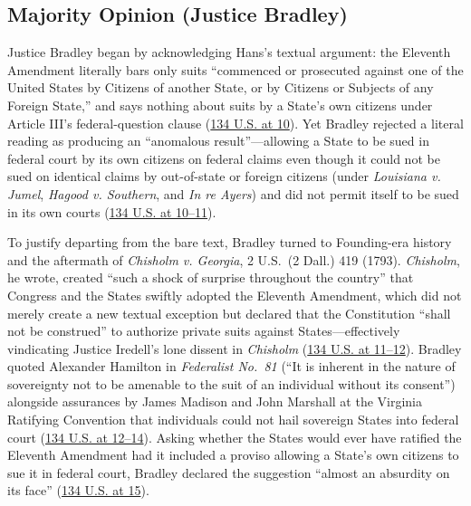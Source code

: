 \documentclass[12pt]{article}
\begin{document}
\subsection{Majority Opinion (Justice Bradley)}
Justice Bradley began by acknowledging Hans's textual argument: the Eleventh Amendment literally bars only suits ``commenced or prosecuted against one of the United States by Citizens of another State, or by Citizens or Subjects of any Foreign State,'' and says nothing about suits by a State's own citizens under Article III's federal-question clause (\href{https://supreme.justia.com/cases/federal/us/134/1/}{134 U.S. at 10}). Yet Bradley rejected a literal reading as producing an ``anomalous result''---allowing a State to be sued in federal court by its own citizens on federal claims even though it could not be sued on identical claims by out-of-state or foreign citizens (under \textit{Louisiana v. Jumel}, \textit{Hagood v. Southern}, and \textit{In re Ayers}) and did not permit itself to be sued in its own courts (\href{https://supreme.justia.com/cases/federal/us/134/1/}{134 U.S. at 10--11}).

To justify departing from the bare text, Bradley turned to Founding-era history and the aftermath of \textit{Chisholm v. Georgia}, 2 U.S.\ (2 Dall.) 419 (1793). \textit{Chisholm}, he wrote, created ``such a shock of surprise throughout the country'' that Congress and the States swiftly adopted the Eleventh Amendment, which did not merely create a new textual exception but declared that the Constitution ``shall not be construed'' to authorize private suits against States---effectively vindicating Justice Iredell's lone dissent in \textit{Chisholm} (\href{https://supreme.justia.com/cases/federal/us/134/1/}{134 U.S. at 11--12}). Bradley quoted Alexander Hamilton in \textit{Federalist No.\ 81} (``It is inherent in the nature of sovereignty not to be amenable to the suit of an individual without its consent'') alongside assurances by James Madison and John Marshall at the Virginia Ratifying Convention that individuals could not hail sovereign States into federal court (\href{https://supreme.justia.com/cases/federal/us/134/1/}{134 U.S. at 12--14}). Asking whether the States would ever have ratified the Eleventh Amendment had it included a proviso allowing a State's own citizens to sue it in federal court, Bradley declared the suggestion ``almost an absurdity on its face'' (\href{https://supreme.justia.com/cases/federal/us/134/1/}{134 U.S. at 15}).
\end{document}
